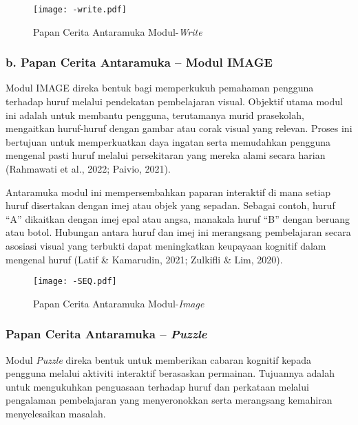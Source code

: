  \begin{figure}[h]
        \centering
        \texttt{[image: -write.pdf]}
        \caption{Papan Cerita Antaramuka Modul-\textit{Write}}
    \label{fig:AntaramukaModulWrite}
    
\end{figure}
\vspace{3cm}



\subsubsection{b. Papan Cerita Antaramuka – Modul IMAGE}

Modul IMAGE direka bentuk bagi memperkukuh pemahaman pengguna terhadap huruf melalui pendekatan pembelajaran visual. Objektif utama modul ini adalah untuk membantu pengguna, terutamanya murid prasekolah, mengaitkan huruf-huruf dengan gambar atau corak visual yang relevan. Proses ini bertujuan untuk memperkuatkan daya ingatan serta memudahkan pengguna mengenal pasti huruf melalui persekitaran yang mereka alami secara harian (Rahmawati et al., 2022; Paivio, 2021).

Antaramuka modul ini mempersembahkan paparan interaktif di mana setiap huruf disertakan dengan imej atau objek yang sepadan. Sebagai contoh, huruf “A” dikaitkan dengan imej epal atau angsa, manakala huruf “B” dengan beruang atau botol. Hubungan antara huruf dan imej ini merangsang pembelajaran secara asosiasi visual yang terbukti dapat meningkatkan keupayaan kognitif dalam mengenal huruf (Latif \& Kamarudin, 2021; Zulkifli \& Lim, 2020).



\begin{figure}[h]
    \centering
    \texttt{[image: -SEQ.pdf]}
    \caption{Papan Cerita Antaramuka Modul-\textit{Image}}
    \label{fig:Papan_Cerita_Antaramuka_Image}
\end{figure}


\subsubsection{Papan Cerita Antaramuka – \textit{Puzzle}}

Modul \textit{Puzzle} direka bentuk untuk memberikan cabaran kognitif kepada pengguna melalui aktiviti interaktif berasaskan permainan. Tujuannya adalah untuk mengukuhkan penguasaan terhadap huruf dan perkataan melalui pengalaman pembelajaran yang menyeronokkan serta merangsang kemahiran menyelesaikan masalah.

